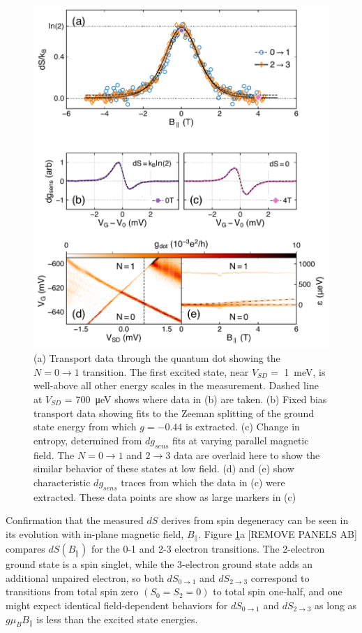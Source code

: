 \documentclass[preprint,showpacs,preprintnumbers,amsmath,amssymb,pra,aps,superscriptaddress]{revtex4-1}
\begin{document}
\begin{figure}
        \includegraphics[width=1.0\columnwidth]{../figures/figure_3.pdf}
        \caption{\label{fig:fig3}(a) Transport data through the quantum dot showing the $N=0 \rightarrow 1$ transition. The first excited state, near $V_{SD} = $ \SI{1}{\milli\electronvolt}, is well-above all other energy scales in the measurement. Dashed line at $V_{SD}$ = \SI{700}{\micro\electronvolt} shows where data in (b) are taken. (b) Fixed bias transport data showing fits to the Zeeman splitting of the ground state energy from which $g = -0.44$ is extracted. (c) Change in entropy, determined from $dg_{sens}$ fits at varying parallel magnetic field. The $N=0 \rightarrow 1$ and $2 \rightarrow 3$ data are overlaid here to show the similar behavior of these states at low field. (d) and (e) show characteristic $dg_{sens}$ traces from which the data in (c) were extracted. These data points are show as large markers in (c)}
\end{figure}

Confirmation that the measured $dS$ derives from spin degeneracy can be seen in its evolution with in-plane magnetic field, $B_\parallel$. Figure \ref{fig:fig3}a [REMOVE PANELS AB] compares $dS(B_\parallel)$ for the 0-1 and 2-3 electron transitions.  The 2-electron ground state is a spin singlet, while the 3-electron ground state adds an additional unpaired electron, so both $dS_{0 \rightarrow 1}$ and $dS_{2 \rightarrow 3}$ correspond to transitions from total spin zero $(S_0=S_2=0)$ to total spin one-half, and one might expect identical field-dependent behaviors for $dS_{0\rightarrow 1}$ and $dS_{2\rightarrow 3}$ as long as $g \mu_{B} B_\parallel$ is less than the excited state energies.
\end{document}
